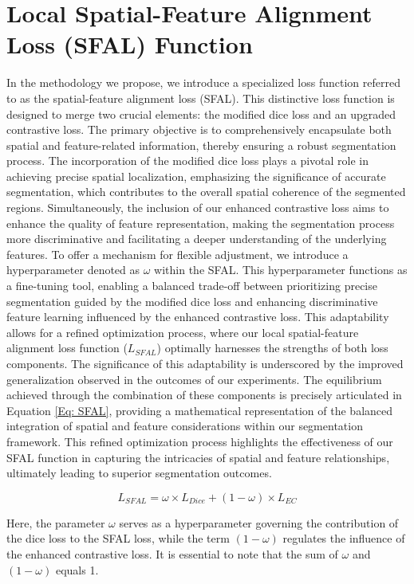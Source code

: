 \section{Local Spatial-Feature Alignment Loss (SFAL) Function}
In the methodology we propose, we introduce a specialized loss function referred to as the spatial-feature alignment loss (SFAL). This distinctive loss function is designed to merge two crucial elements: the modified dice loss and an upgraded contrastive loss. The primary objective is to comprehensively encapsulate both spatial and feature-related information, thereby ensuring a robust segmentation process. The incorporation of the modified dice loss plays a pivotal role in achieving precise spatial localization, emphasizing the significance of accurate segmentation, which contributes to the overall spatial coherence of the segmented regions. Simultaneously, the inclusion of our enhanced contrastive loss aims to enhance the quality of feature representation, making the segmentation process more discriminative and facilitating a deeper understanding of the underlying features. To offer a mechanism for flexible adjustment, we introduce a hyperparameter denoted as \(\omega\) within the SFAL. This hyperparameter functions as a fine-tuning tool, enabling a balanced trade-off between prioritizing precise segmentation guided by the modified dice loss and enhancing discriminative feature learning influenced by the enhanced contrastive loss. This adaptability allows for a refined optimization process, where our local spatial-feature alignment loss function (\(L_{SFAL}\)) optimally harnesses the strengths of both loss components. The significance of this adaptability is underscored by the improved generalization observed in the outcomes of our experiments. The equilibrium achieved through the combination of these components is precisely articulated in Equation \ref{Eq: SFAL}, providing a mathematical representation of the balanced integration of spatial and feature considerations within our segmentation framework. This refined optimization process highlights the effectiveness of our SFAL function in capturing the intricacies of spatial and feature relationships, ultimately leading to superior segmentation outcomes.

\begin{equation} \label{Eq: SFAL}
    L_{SFAL} = \omega \times L_{Dice} + (1 - \omega) \times L_{EC}
\end{equation}

Here, the parameter $\omega$ serves as a hyperparameter governing the contribution of the dice loss to the SFAL loss, while the term \((1 - \omega)\) regulates the influence of the enhanced contrastive loss. It is essential to note that the sum of $\omega$ and \((1-\omega)\) equals 1.

